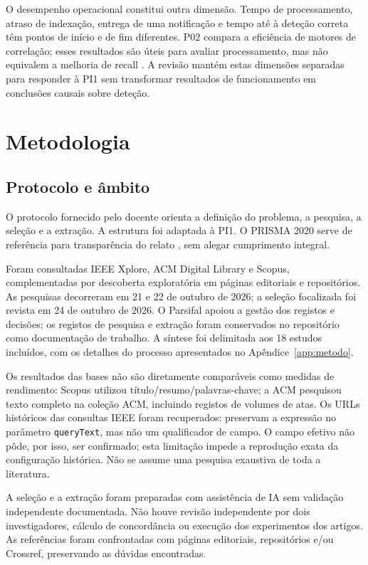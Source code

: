 \documentclass[11pt,a4paper]{article}
\begin{document}
O desempenho operacional constitui outra dimensão. Tempo de processamento, atraso de indexação, entrega de uma notificação e tempo até à deteção correta têm pontos de início e de fim diferentes. P02 compara a eficiência de motores de correlação; esses resultados são úteis para avaliar processamento, mas não equivalem a melhoria de recall \citep{sheeraz2024}. A revisão mantém estas dimensões separadas para responder à PI1 sem transformar resultados de funcionamento em conclusões causais sobre deteção.

\section{Metodologia}
\subsection{Protocolo e âmbito}
O protocolo fornecido pelo docente orienta a definição do problema, a pesquisa, a seleção e a extração. A estrutura foi adaptada à PI1. O PRISMA 2020 serve de referência para transparência do relato \citep{page2021}, sem alegar cumprimento integral.

Foram consultadas IEEE Xplore, ACM Digital Library e Scopus, complementadas por descoberta exploratória em páginas editoriais e repositórios. As pesquisas decorreram em 21 e 22 de outubro de 2026; a seleção focalizada foi revista em 24 de outubro de 2026. O Parsifal apoiou a gestão dos registos e decisões; os registos de pesquisa e extração foram conservados no repositório como documentação de trabalho. A síntese foi delimitada aos 18 estudos incluídos, com os detalhes do processo apresentados no Apêndice~\ref{app:metodo}.

Os resultados das bases não são diretamente comparáveis como medidas de rendimento: Scopus utilizou título/resumo/palavras-chave; a ACM pesquisou texto completo na coleção ACM, incluindo registos de volumes de atas. Os URLs históricos das consultas IEEE foram recuperados: preservam a expressão no parâmetro \texttt{queryText}, mas não um qualificador de campo. O campo efetivo não pôde, por isso, ser confirmado; esta limitação impede a reprodução exata da configuração histórica. Não se assume uma pesquisa exaustiva de toda a literatura.

A seleção e a extração foram preparadas com assistência de IA sem validação independente documentada. Não houve revisão independente por dois investigadores, cálculo de concordância ou execução dos experimentos dos artigos. As referências foram confrontadas com páginas editoriais, repositórios e/ou Crossref, preservando as dúvidas encontradas.
\end{document}
